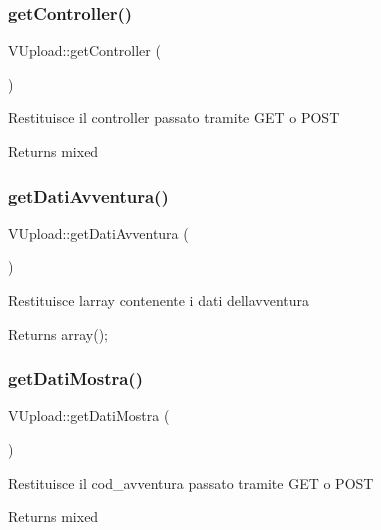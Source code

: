 \subsubsection{\texorpdfstring{get\+Controller()}{getController()}}
{\footnotesize\ttfamily V\+Upload\+::get\+Controller (\begin{DoxyParamCaption}{ }\end{DoxyParamCaption})}

Restituisce il controller passato tramite G\+ET o P\+O\+ST

\begin{DoxyReturn}{Returns}
mixed 
\end{DoxyReturn}
\mbox{\label{class_v_upload_a749ab9044ba53189edc5cd96c6913942}} 
\subsubsection{\texorpdfstring{get\+Dati\+Avventura()}{getDatiAvventura()}}
{\footnotesize\ttfamily V\+Upload\+::get\+Dati\+Avventura (\begin{DoxyParamCaption}{ }\end{DoxyParamCaption})}

Restituisce l\textquotesingle{}array contenente i dati dell\textquotesingle{}avventura

\begin{DoxyReturn}{Returns}
array(); 
\end{DoxyReturn}
\mbox{\label{class_v_upload_a2e28d01ebb2b23c71a8f91ed94c56bd4}} 
\subsubsection{\texorpdfstring{get\+Dati\+Mostra()}{getDatiMostra()}}
{\footnotesize\ttfamily V\+Upload\+::get\+Dati\+Mostra (\begin{DoxyParamCaption}{ }\end{DoxyParamCaption})}

Restituisce il cod\+\_\+avventura passato tramite G\+ET o P\+O\+ST

\begin{DoxyReturn}{Returns}
mixed 
\end{DoxyReturn}
\mbox{\label{class_v_upload_a56b4c2fa5878156be19ff557b2bf1391}} 
